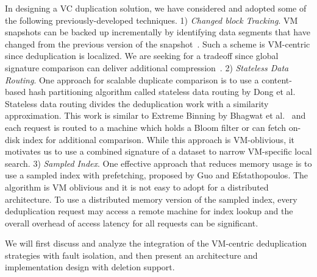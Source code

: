 In designing a VC duplication solution, we have considered and adopted some of
the following previously-developed techniques.
1)
{\em Changed block Tracking}.
VM snapshots can be  backed up  incrementally by identifying data segments that have
changed from the previous version of the snapshot~\cite{Clements2009,Vrable2009,TanIPDPS2011}.
Such a scheme  is  VM-centric since deduplication is localized. 
We are seeking for a tradeoff since 
global signature comparison can deliver additional compression~\cite{Guo2011,Dong2011,extreme_binning09}.
2) {\em Stateless  Data Routing}.
One approach for scalable duplicate comparison is to use a content-based hash
partitioning algorithm called stateless data routing by Dong et al.~\cite{Dong2011} 
Stateless data routing divides the deduplication work with a similarity approximation. This work 
is similar to Extreme Binning by Bhagwat et al.~\cite{extreme_binning09} and 
each request is routed  to a machine which holds
a Bloom filter  or can fetch on-disk index for additional comparison.
While this approach is VM-oblivious, it motivates us to  use  a combined signature of a dataset to narrow
VM-specific local search.
3) {\em Sampled Index}.
One effective approach that reduces memory usage is 
to use a sampled index with prefetching, proposed  by Guo and Efstathopoulos\cite{Guo2011}. 
The algorithm is VM oblivious and it is not easy  to adopt for a distributed architecture. 
To use a distributed memory version of the sampled index, every deduplication request
may access a remote machine for index lookup and the overall overhead of access latency for all requests
can be significant.  


We will first discuss and analyze the integration of the VM-centric deduplication strategies with fault isolation, 
and then present
an architecture and implementation design with deletion support.
